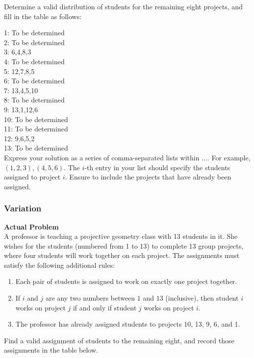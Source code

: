 Determine a valid distribution of students for the remaining eight projects, and fill in the table as follows:

1: To be determined \\
2: To be determined \\
3: 6,4,8,3 \\
4: To be determined \\
5: 12,7,8,5 \\
6: To be determined \\
7: 13,4,5,10 \\
8: To be determined \\
9: 13,1,12,6 \\
10: To be determined \\
11: To be determined \\
12: 9,6,5,2 \\
13: To be determined \\

Express your solution as a series of comma-separated lists within $\boxed{...}$. For example, $\boxed{(1,2,3),(4,5,6)}$. The $i$-th entry in your list should specify the students assigned to project $i$. Ensure to include the projects that have already been assigned.

\subsubsection{Variation}
\textbf{Actual Problem}\\
A professor is teaching a projective geometry class with 13 students in it. She wishes for the students (numbered from 1 to 13) to complete 13 group projects, where four students will work together on each project. The assignments must satisfy the following additional rules:

\begin{enumerate}
    \item Each pair of students is assigned to work on exactly one project together.
    \item If $i$ and $j$ are any two numbers between $1$ and $13$ (inclusive), then student $i$ works on project $j$ if and only if student $j$ works on project $i$.
    \item The professor has already assigned students to projects 10, 13, 9, 6, and 1.
\end{enumerate}

Find a valid assignment of students to the remaining eight, and record those assignments in the table below.

